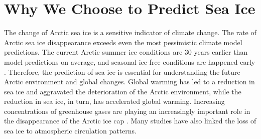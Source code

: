 
\section{Why We Choose to Predict Sea Ice}
The change of Arctic sea ice is a sensitive indicator of climate change. The rate of Arctic sea ice disappearance exceeds even the most pessimistic climate model predictions. The current Arctic summer ice conditions are 30 years earlier than model predictions on average, and seasonal ice-free conditions are happened early \cite{stroeve_frei_mccreight_ghatak_2008}. Therefore, the prediction of sea ice is essential for understanding the future Arctic environment and global changes. Global warming has led to a reduction in sea ice and aggravated the deterioration of the Arctic environment, while the reduction in sea ice, in turn, has accelerated global warming. Increasing concentrations of greenhouse gases are playing an increasingly important role in the disappearance of the Arctic ice cap \cite{kim2019satellite}. Many studies have also linked the loss of sea ice to atmospheric circulation patterns.

